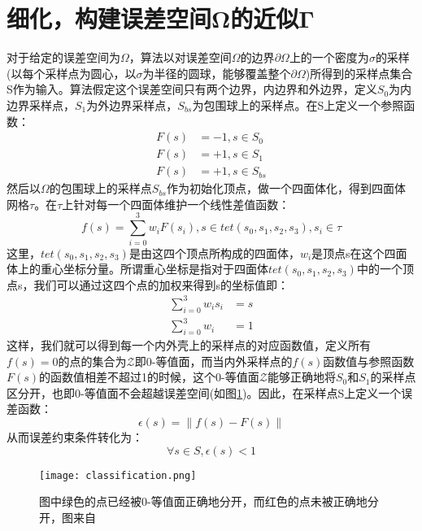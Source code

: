 \section{细化，构建误差空间Ω的近似Γ}
对于给定的误差空间为$\Omega$，算法以对误差空间$\Omega$的边界$\partial \Omega$上的一个密度为$\sigma$的采样(以每个采样点为圆心，以$\sigma$为半径的圆球，能够覆盖整个$\partial \Omega$)所得到的采样点集合S作为输入。算法假定这个误差空间只有两个边界，内边界和外边界，定义$S_0$为内边界采样点，$S_1$为外边界采样点，$S_{bs}$为包围球上的采样点。在S上定义一个参照函数：
\begin{equation}
  \begin{split}
    F(s) &= -1, s\in S_0\\
    F(s) &= +1, s\in S_1\\
    F(s) &= +1, s\in S_{bs}
  \end{split}
\end{equation}
然后以$\Omega$的包围球上的采样点$S_{bs}$作为初始化顶点，做一个四面体化，得到四面体网格$\tau$。在$\tau$上针对每一个四面体维护一个线性差值函数：
\begin{equation}
  f(s) = \sum_{i=0}^3 w_iF(s_i), s\in tet(s_0, s_1, s_2, s_3), s_i \in \tau
  \label{eq:linear-interpolation}
\end{equation}
这里，$tet(s_0, s_1, s_2, s_3)$是由这四个顶点所构成的四面体，$w_i$是顶点s在这个四面体上的重心坐标分量。所谓重心坐标是指对于四面体$tet(s_0, s_1, s_2, s_3)$中的一个顶点s，我们可以通过这四个点的加权来得到s的坐标值即：
\begin{equation}
  \begin{split}
  \sum_{i=0}^3 w_i s_i &= s\\
  \sum_{i=0}^3 w_i &= 1
  \end{split}
  \label{eq:err-constraint}
\end{equation}
这样，我们就可以得到每一个内外壳上的采样点的对应函数值，定义所有$f(s)=0$的点的集合为$\mathcal{Z}$即0-等值面，而当内外采样点的$f(s)$函数值与参照函数$F(s)$的函数值相差不超过1的时候，这个0-等值面$\mathcal{Z}$能够正确地将$S_0$和$S_1$的采样点区分开，也即0-等值面不会超越误差空间(如图\ref{fig:isotopic-classification})。因此，在采样点S上定义一个误差函数：
\begin{equation}
  \epsilon(s) = \lVert f(s)-F(s) \rVert
\end{equation}
从而误差约束条件转化为：
\begin{equation}
  \forall s \in S, \epsilon(s)<1
\end{equation}

\begin{figure}[htbp]
    \centering
    \texttt{[image: classification.png]}
    \caption[0-等值面区分误差边界采样点]{图中绿色的点已经被0-等值面正确地分开，而红色的点未被正确地分开，图来自\cite{isotopic-appro}}
    \label{fig:isotopic-classification}
\end{figure}


